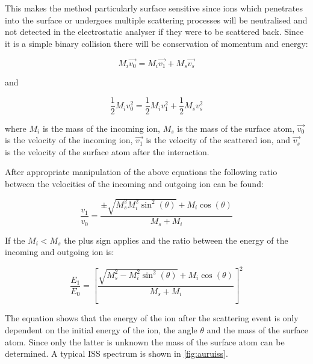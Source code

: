 This makes the method particularly surface sensitive since ions which penetrates into the surface or undergoes multiple scattering processes will be neutralised and not detected in the electrostatic analyser if they were to be scattered back. Since it is a simple binary collision there will be conservation of momentum and energy:

\begin{equation}
M_i\vec{v_0}=M_i\vec{v_1}+M_s\vec{v_s}
\end{equation}

\noindent and
 
\begin{equation}
\frac{1}{2}M_iv_0^2=\frac{1}{2}M_iv_1^2+\frac{1}{2}M_sv_s^2
\end{equation}

\noindent where $M_i$ is the mass of the incoming ion, $M_s$ is the mass of the surface atom, $\vec{v_0}$ is the velocity of the incoming ion, $\vec{v_1}$ is the velocity of the scattered ion, and $\vec{v_s}$ is the velocity of the surface atom after the interaction.

After appropriate manipulation of the above equations the following ratio between the velocities of the incoming and outgoing ion can be found:

\begin{equation}
\frac{v_1}{v_0}=\frac{\pm\sqrt{M_s^2M_i^2\sin^2(\theta)}+M_i\cos(\theta)}{M_s+M_i}
\end{equation}

If the $M_i<M_s$ the plus sign applies and the ratio between the energy of the incoming and outgoing ion is:

\begin{equation}
\frac{E_1}{E_0}=\left[\frac{\sqrt{M_s^2-M_i^2\sin^2(\theta)}+M_i\cos(\theta)}{M_s+M_i}\right]^2
\label{eq:ion_energy}
\end{equation}

The equation shows that the energy of the ion after the scattering event is only dependent on the initial energy of the ion, the angle $\theta$ and the mass of the surface atom. Since only the latter is unknown the mass of the surface atom can be determined. A typical ISS spectrum is shown in \autoref{fig:auruiss}.


